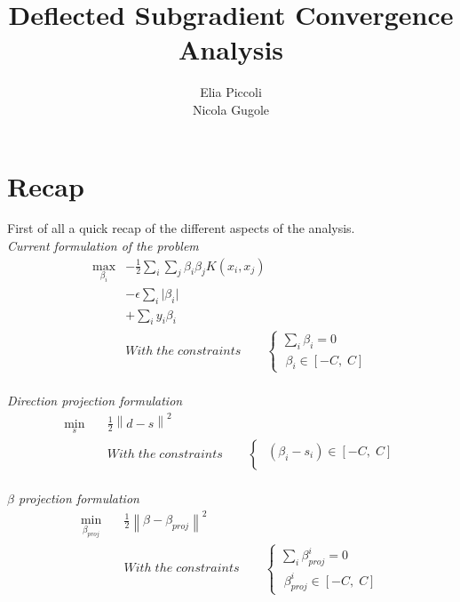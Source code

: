 \documentclass[12pt]{article}
\title{Deflected Subgradient Convergence Analysis}
\date{}
\author{Elia Piccoli\\ Nicola Gugole}
\newcommand{\norm}[1]{\left\lVert#1\right\rVert}
\newcommand{\abs}[1]{\lvert#1\rvert}
\begin{document}
    \maketitle
    \pagebreak
    \section{Recap}
    First of all a quick recap of the different aspects of the analysis.\\
    \emph{Current formulation of the problem}
	\begin{equation}\label{eq:1}
	    \begin{aligned}
	    \max_{\beta_i} &- \frac{1}{2}\sum_i \sum_j \beta_i \beta_j K(x_i,x_j) \\
		&- \epsilon\sum_i\abs{\beta_i}\\
		&+ \sum_i y_i\beta_i\\
		&With\;the\;constraints\qquad
        \begin{cases}
            \sum_i \beta_i = 0 \\
            \;\beta_i\in[-C,\;C] 
        \end{cases}
        \end{aligned}
	\end{equation} \\
    \emph{Direction projection formulation}
        \begin{equation}\label{eq:2}
	    \begin{aligned}
	    \min_{s} \quad &\frac{1}{2}\norm{d - s}^2\\
	    &With\;the\;constraints\qquad
        \begin{cases}
            \;(\beta_i -s_i)\in[-C,\;C]\\
        \end{cases}
        \end{aligned}
	\end{equation} \\
	\emph{$\beta$ projection formulation}
    \begin{equation}\label{eq:3}
	    \begin{aligned}
	    \min_{\beta_{proj}} \quad &\frac{1}{2}\norm{\beta - \beta_{proj}}^2\\ 
		&With\;the\;constraints\qquad
        \begin{cases}
            \sum_i \beta_{proj}^i = 0 \\
            \;\beta_{proj}^i\in[-C,\;C] 
        \end{cases}
        \end{aligned}
	\end{equation}
	
\end{document}

